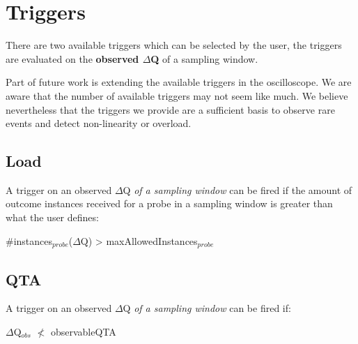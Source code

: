 \section{Triggers}
    There are two available triggers which can be selected by the user, the triggers are evaluated on the \textbf{observed $\Delta$Q} of a sampling window.

    Part of future work is extending the available triggers in the oscilloscope. We are aware that the number of available triggers may not seem like much. We believe nevertheless that the triggers we provide are a sufficient basis to observe rare events and detect non-linearity or overload. 
    \subsection{Load}
        A trigger on an observed $\Delta$Q \textit{of a sampling window} can be fired if the amount of outcome instances received for a probe in a sampling window is greater than what the user defines:
    \begin{center}
        \#instances$_{probe}$($\Delta$Q) > maxAllowedInstances$_{probe}$ 
    \end{center}

    \subsection{QTA}
        A trigger on an observed $\Delta$Q \textit{of a sampling window} can be fired if:
        \begin{center}
            $\Delta$Q$_{obs}$ $\nless$ observableQTA
        \end{center}
